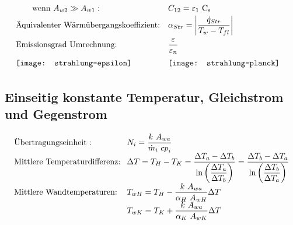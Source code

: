 \[\begin{array}{llc}
		\text{\qquad wenn }A_{w2} \gg A_{w1}:             & C_{12} = \varepsilon_1\ \Cs                                                                                                                                                                         &                                                                               \\
		\text{Äquivalenter Wärmübergangskoeffizient:}     & \alpha_{Str} = \abs{\dfrac{{\dot{q}}_{Str}}{T_w - T_{fl}}}                                                                                                                                          &                                                                               \\
		\text{Emissionsgrad Umrechnung:}                  & \dfrac{\varepsilon}{\varepsilon_n}                                                                                                                                                                  &                                                                               \\
		\texttt{[image: strahlung-epsilon]}    & \texttt{[image: strahlung-planck]}       &
	\end{array} \]



\subsection{Einseitig konstante Temperatur, Gleichstrom und Gegenstrom}
	\setlength{\abovedisplayskip}{-15pt}
	\[ \arraycolsep=0.4em  \def\arraystretch{1.7}
	\begin{array}{ll}
		\text{Übertragungseinheit}:          & N_i  =  \dfrac{k\ A_{wa}}{{\dot{m}}_i\ {cp}_i}                                                                                                                                                   \\
		\text{Mittlere Temperaturdifferenz:} & \Delta T  =  T_H - T_K  =  \dfrac{\Delta T_a - \Delta T_b} {\ln\left( \dfrac{\Delta T_a}{\Delta T_b}\right)} = \dfrac{\Delta T_b - \Delta T_a} {\ln\left( \dfrac{\Delta T_b}{\Delta T_a}\right)} \\
		\text{Mittlere Wandtemperaturen:}    & T_{wH}  =  T_H - \dfrac{k\ A_{wa}}{\alpha_H\ A_{wH}} \Delta T                                                                                                                                    \\
		                                     & T_{wK}  =  T_K + \dfrac{k\ A_{wa}}{\alpha_K\ A_{wK}} \Delta T
	\end{array} \]

